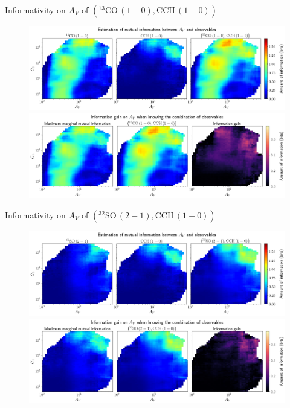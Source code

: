 \documentclass{beamer}
\begin{document}
\begin{frame}{Informativity on $A_V$ of $\left(\mathrm{^{13}CO\,(1-0)},\mathrm{CCH\,(1-0)}\right)$}
    \begin{figure}
        \centering
        \includegraphics[width=0.95\linewidth]{../mi/av__13co10_cch10_mi.png}
        \vfill
        \includegraphics[width=0.95\linewidth]{../mi/av__13co10_cch10_mi_gain.png}
    \end{figure}
\end{frame}

\begin{frame}{Informativity on $A_V$ of $\left(\mathrm{^{32}SO\,(2-1)},\mathrm{CCH\,(1-0)}\right)$}
    \begin{figure}
        \centering
        \includegraphics[width=0.95\linewidth]{../mi/av__32so21_cch10_mi.png}
        \vfill
        \includegraphics[width=0.95\linewidth]{../mi/av__32so21_cch10_mi_gain.png}
    \end{figure}
\end{frame}
\end{document}
